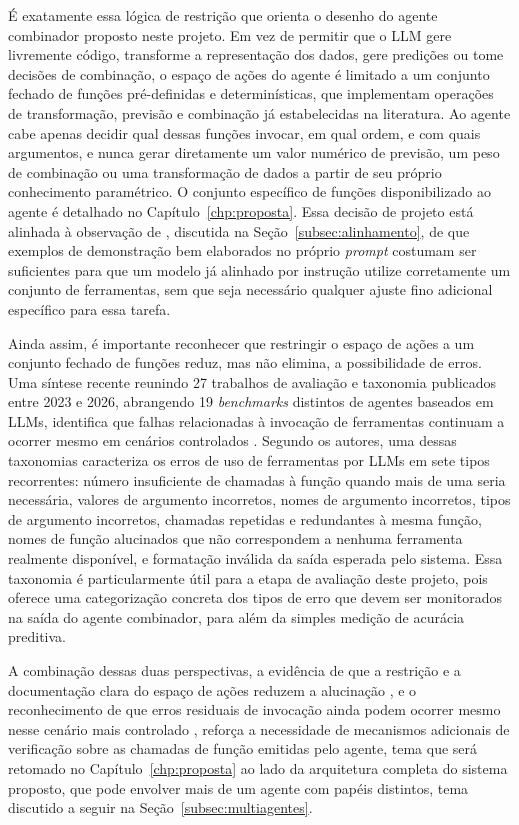É exatamente essa lógica de restrição que orienta o desenho do agente combinador proposto neste projeto. Em vez de permitir que o LLM gere livremente código, transforme a representação dos dados, gere predições ou tome decisões de combinação, o espaço de ações do agente é limitado a um conjunto fechado de funções pré-definidas e determinísticas, que implementam operações de transformação, previsão e combinação já estabelecidas na literatura. Ao agente cabe apenas decidir qual dessas funções invocar, em qual ordem, e com quais argumentos, e nunca gerar diretamente um valor numérico de previsão, um peso de combinação ou uma transformação de dados a partir de seu próprio conhecimento paramétrico. O conjunto específico de funções disponibilizado ao agente é detalhado no Capítulo~\ref{chp:proposta}. Essa decisão de projeto está alinhada à observação de \citet{kumar2026metatool}, discutida na Seção~\ref{subsec:alinhamento}, de que exemplos de demonstração bem elaborados no próprio \textit{prompt} costumam ser suficientes para que um modelo já alinhado por instrução utilize corretamente um conjunto de ferramentas, sem que seja necessário qualquer ajuste fino adicional específico para essa tarefa.

Ainda assim, é importante reconhecer que restringir o espaço de ações a um conjunto fechado de funções reduz, mas não elimina, a possibilidade de erros. Uma síntese recente reunindo 27 trabalhos de avaliação e taxonomia publicados entre 2023 e 2026, abrangendo 19 \textit{benchmarks} distintos de agentes baseados em LLMs, identifica que falhas relacionadas à invocação de ferramentas continuam a ocorrer mesmo em cenários controlados \citep{albayaydh2026beyond}. Segundo os autores, uma dessas taxonomias caracteriza os erros de uso de ferramentas por LLMs em sete tipos recorrentes: número insuficiente de chamadas à função quando mais de uma seria necessária, valores de argumento incorretos, nomes de argumento incorretos, tipos de argumento incorretos, chamadas repetidas e redundantes à mesma função, nomes de função alucinados que não correspondem a nenhuma ferramenta realmente disponível, e formatação inválida da saída esperada pelo sistema. Essa taxonomia é particularmente útil para a etapa de avaliação deste projeto, pois oferece uma categorização concreta dos tipos de erro que devem ser monitorados na saída do agente combinador, para além da simples medição de acurácia preditiva.

A combinação dessas duas perspectivas, a evidência de que a restrição e a documentação clara do espaço de ações reduzem a alucinação \citep{patil2023gorilla}, e o reconhecimento de que erros residuais de invocação ainda podem ocorrer mesmo nesse cenário mais controlado \citep{albayaydh2026beyond}, reforça a necessidade de mecanismos adicionais de verificação sobre as chamadas de função emitidas pelo agente, tema que será retomado no Capítulo~\ref{chp:proposta} ao lado da arquitetura completa do sistema proposto, que pode envolver mais de um agente com papéis distintos, tema discutido a seguir na Seção~\ref{subsec:multiagentes}.



